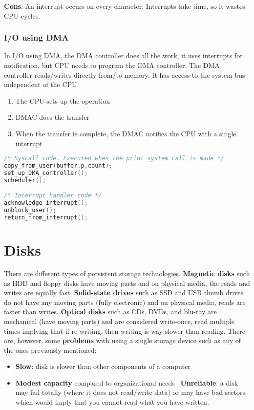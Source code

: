 \documentclass{article}
\newcommand{\bold}[1]{\textbf{#1}}
\renewcommand{\b}{\item[$\circ$]}
\newcommand{\newlist}{\begin{itemize}}
\renewcommand{\endlist}{\end{itemize}}
\begin{document}
\bold{Cons}: An interrupt occurs on every character. Interrupts take time, so it wastes CPU cycles. 

\subsubsection{I/O using DMA}

In I/O using DMA, the DMA controller does all the work, it uses interrupts for notification, but CPU needs to program the DMA controller. The DMA controller reads/writes directly from/to memory. It has access to the system bus independent of the CPU.

\begin{enumerate}
    \item The CPU sets up the operation
    \item DMAC does the transfer
    \item When the transfer is complete, the DMAC notifies the CPU with a single interrupt
\end{enumerate}

\begin{lstlisting}[language=C, caption=Printing a string using DMA]
/* Syscall code. Executed when the print system call is made */
copy_from_user(buffer,p,count);
set_up_DMA_controller();
scheduler();

/* Interrupt handler code */
acknowledge_interrupt();
unblock_user();
return_from_interrupt();
\end{lstlisting}

\section{Disks}

There are different types of persistent storage technologies. \bold{Magnetic disks} such as HDD and floppy disks have moving parts and on physical media, the reads and writes are equally fast. \bold{Solid-state drives} such as SSD and USB thumb drives do not have any moving parts (fully electronic) and on physical media, reads are faster than writes. \bold{Optical disks} such as CDs, DVDs, and blu-ray are mechanical (have moving parts) and are considered write-once, read multiple times implying that if re-writing, then writing is way slower than reading. There are, however, some \bold{problems} with using a single storage device such as any of the ones previously mentioned:

\newlist 
\b \bold{Slow}: disk is slower than other components of a computer
\b \bold{Modest capacity} compared to organizational needs
\ \bold{Unreliable}: a disk may fail totally (where it does not read/write data) or may have bad sectors which would imply that you cannot read what you have written. 
\endlist
\end{document}
